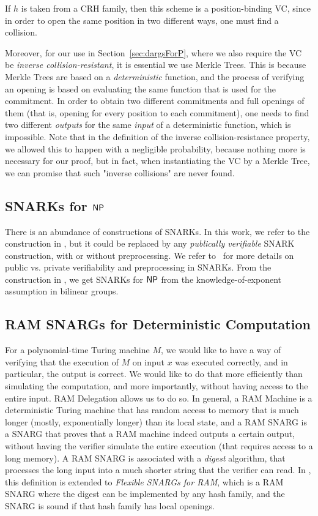 If $h$ is taken from a CRH family, then this scheme is a position-binding VC, since in order to open the same position in two different ways, one must find a collision.

Moreover, for our use in Section~\ref{sec:dargsForP}, where we also require the VC be \emph{inverse collision-resistant}, it is essential we use Merkle Trees. This is because Merkle Trees are based on a \emph{deterministic} function, and the process of verifying an opening is based on evaluating the same function that is used for the commitment. In order to obtain two different commitments and full openings of them (that is, opening for every position to each commitment), one needs to find two different \emph{outputs} for the same \emph{input} of a deterministic function, which is impossible. Note that in the definition of the inverse collision-resistance property, we allowed this to happen with a negligible probability, because nothing more is necessary for our proof, but in fact, when instantiating the VC by a Merkle Tree, we can promise that such "inverse collisions" are never found.

\subsection{SNARKs for ${\mathsf{NP}}$}\label{app:crypto:SNARKs}
There is an abundance of constructions of SNARKs. In this work, we refer to the construction in \cite{bitansky2013SNARKsLIPs}, but it could be replaced by any \emph{publically verifiable} SNARK construction, with or without preprocessing. We refer to~\cite{bitansky2013SNARKsLIPs, bitansky2013recursive} for more details on public vs. private verifiability and preprocessing in SNARKs.
From the construction in \cite{bitansky2013SNARKsLIPs}, we get SNARKs for ${\mathsf{NP}}$ from the knowledge-of-exponent assumption in bilinear groups.

\subsection{RAM SNARGs for Deterministic Computation}\label{app:crypto:ramsnargs}
For a polynomial-time Turing machine $M$, we would like to have a way of verifying that the execution of $M$ on input $x$ was executed correctly, and in particular, the output is correct. We would like to do that more efficiently than simulating the computation, and more importantly, without having access to the entire input. RAM Delegation allows us to do so. In general, a RAM Machine is a deterministic Turing machine that has random access to memory that is much longer (mostly, exponentially longer) than its local state, and a RAM SNARG is a SNARG that proves that a RAM machine indeed outputs a certain output, without having the verifier simulate the entire execution (that requires access to a long memory). A RAM SNARG is associated with a \emph{digest} algorithm, that processes the long input into a much shorter string that the verifier can read. In \cite{cryptoeprint:2022/1320}, this definition is extended to \emph{Flexible SNARGs for RAM}, which is a RAM SNARG where the digest can be implemented by any hash family, and the SNARG is sound if that hash family has local openings.

